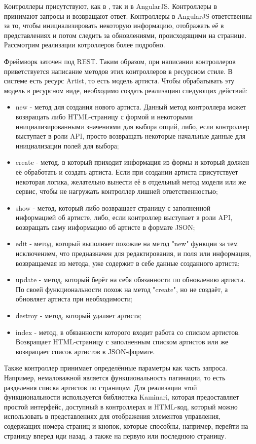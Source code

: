 Контроллеры присутствуют, как в \ror{}, так и в AngularJS. Контроллеры в \ror{} принимают запросы и возвращают ответ. Контроллеры в AngularJS ответственны за то, чтобы инициализировать некоторую информацию, отображать её в представлениях и потом следить за обновлениями, происходящими на странице. Рассмотрим реализации котроллеров более подробно.

Фреймворк \ror{} заточен под REST. Таким образом, при написании контроллеров приветствуется написание методов этих контроллеров в ресурсном стиле. В системе есть ресурс Artist, то есть модель артиста. Чтобы обрабатывать эту модель в ресурсном виде, необходимо создать реализацию следующих действий:

\begin{itemize}
  \item new - метод для создания нового артиста. Данный метод контроллера может возвращать либо HTML-страницу с формой и некоторыми инициализированными значениями для выбора опций, либо, если контроллер выступает в роли API, просто возвращать некоторые начальные данные для инициализации полей для выбора;
  \item create - метод, в который приходит информация из формы и который должен её обработать и создать артиста. Если при создании артиста присутствует некоторая логика, желательно вынести её в отдельный метод модели или же сервис, чтобы не нагружать контроллер лишней ответственностью;
  \item show - метод, который либо возвращает страницу с заполненной информацией об артисте, либо, если контроллер выступает в роли API, возвращать саму информацию об артисте в формате JSON;
  \item edit - метод, который выполняет похожие на метод "new" функции за тем исключением, что предназначен для редактирования, и поля или информация, возвращаемая из метода, уже содержит в себе данные созданного артиста;
  \item update - метод, который берёт на себя обязанности по обновлению артиста. По своей функциональности похож на метод "create", но не создаёт, а обновляет артиста при необходимости;
  \item destroy - метод, который удаляет артиста;
  \item index - метод, в обязанности которого входит работа со списком артистов. Возвращает HTML-страницу с заполненным списком артистов или же возвращает список артистов в JSON-формате.
\end{itemize}

Также контроллер принимает определённые параметры как часть запроса. Например, немаловажной является функциональность пагинации, то есть разделения списка артистов по страницам. Для реализации этой функциональности используется библиотека Kaminari, которая предоставляет простой интерфейс, доступный в контроллерах и HTML-код, который можно использовать в представлениях для отображения элементов управления, содержащих номера страниц и кнопок, которые способны, например, перейти на страницу вперед иди назад, а также на первую или последнюю страницу.

